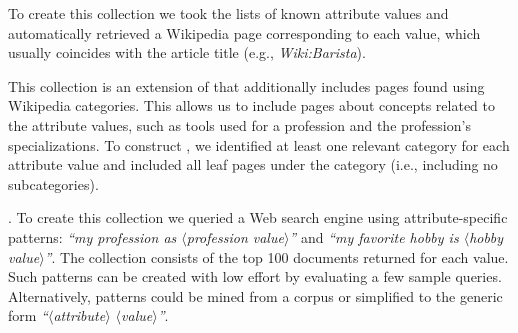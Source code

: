 To create this collection we took the lists of known attribute values and 
automatically retrieved
a Wikipedia page corresponding to each value, which usually coincides with the article title (e.g., \textit{Wiki:Barista}).

This collection is an extension of  that additionally includes pages found using Wikipedia categories.
This allows us to include pages about concepts related to the attribute values, such as tools used for a profession and the profession's specializations.
To construct , we identified at least one relevant category for each attribute value and included all leaf pages under the category (i.e., including no subcategories).

. To create this collection we queried a Web search engine using attribute-specific patterns: \textit{``my profession as $\langle$profession value$\rangle$''} and \textit{``my favorite hobby is $\langle$hobby value$\rangle$''}.
The collection consists of the top 100 documents returned for each value.
Such patterns can be created with low effort by evaluating a few sample queries.
Alternatively, patterns could be mined from a corpus or simplified to the generic form \textit{``$\langle$attribute$\rangle$ $\langle$value$\rangle$''}.





